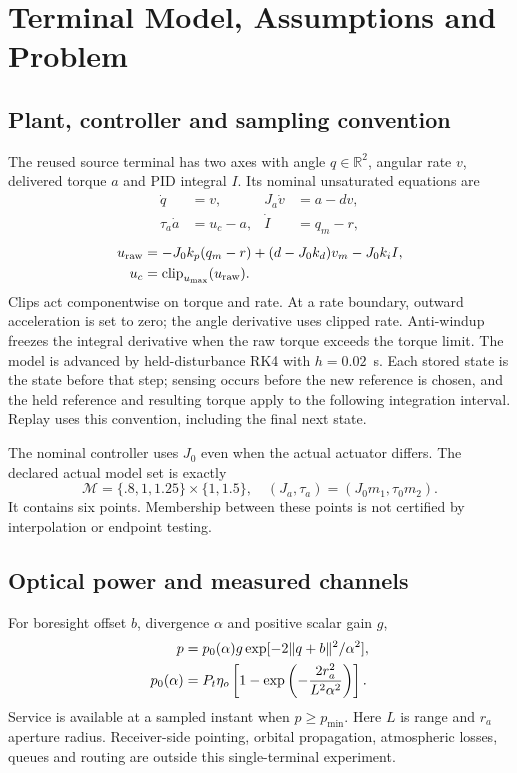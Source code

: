 \section{Terminal Model, Assumptions and Problem}
\subsection{Plant, controller and sampling convention}
The reused source terminal \cite{source} has two axes with angle $q\in\mathbb R^2$, angular rate $v$, delivered torque $a$ and PID integral $I$. Its nominal unsaturated equations are
\begin{align}
\dot q&=v,&J_a\dot v&=a-dv,\nonumber\\
\tau_a\dot a&=u_c-a,&\dot I&=q_m-r,\label{eq:plant}
\end{align}
\begin{align}
u_{\rm raw}&=-J_0k_p(q_m-r)+(d-J_0k_d)v_m-J_0k_iI,\nonumber\\
u_c&=\operatorname{clip}_{u_{\max}}(u_{\rm raw}).\label{eq:pid}
\end{align}
Clips act componentwise on torque and rate. At a rate boundary, outward acceleration is set to zero; the angle derivative uses clipped rate. Anti-windup freezes the integral derivative when the raw torque exceeds the torque limit. The model is advanced by held-disturbance RK4 with $h=0.02$~s. Each stored state is the state before that step; sensing occurs before the new reference is chosen, and the held reference and resulting torque apply to the following integration interval. Replay uses this convention, including the final next state.

The nominal controller uses $J_0$ even when the actual actuator differs. The declared actual model set is exactly
\begin{equation}
\mathcal M=\{.8,1,1.25\}\times\{1,1.5\},\quad
(J_a,\tau_a)=(J_0m_1,\tau_0m_2).
\label{eq:models}
\end{equation}
It contains six points. Membership between these points is not certified by interpolation or endpoint testing.

\subsection{Optical power and measured channels}
For boresight offset $b$, divergence $\alpha$ and positive scalar gain $g$,
\begin{align}
p&=p_0(\alpha)g\exp[-2\lVert q+b\rVert^2/\alpha^2],\label{eq:powerplant}\\
p_0(\alpha)&=P_t\eta_o\left[1-\exp\left(-\frac{2r_a^2}{L^2\alpha^2}\right)\right].\nonumber
\end{align}
Service is available at a sampled instant when $p\geq p_{\min}$. Here $L$ is range and $r_a$ aperture radius. Receiver-side pointing, orbital propagation, atmospheric losses, queues and routing are outside this single-terminal experiment.

